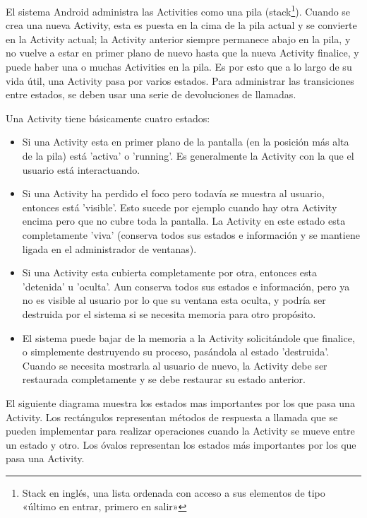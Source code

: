 El sistema Android administra las Activities como una pila (stack\footnote{Stack en inglés, una lista ordenada con acceso a sus elementos de tipo «último en entrar, primero en salir»}). Cuando se crea una nueva Activity, esta es puesta en la cima de la pila actual y se convierte en la Activity actual; la Activity anterior siempre permanece abajo en la pila, y no vuelve a estar en primer plano de nuevo hasta que la nueva Activity finalice, y puede haber una o muchas Activities en la pila.
Es por esto que a lo largo de su vida útil, una Activity pasa por varios estados. Para administrar las transiciones entre estados, se deben usar una serie de devoluciones de llamadas.

Una Activity tiene básicamente cuatro estados:

\begin{itemize}
	\item Si una Activity esta en primer plano de la pantalla (en la posición más alta de la pila) está 'activa' o 'running'. Es generalmente la Activity con la que el usuario está interactuando.
	\item Si una Activity ha perdido el foco pero todavía se muestra al usuario, entonces está 'visible'. Esto sucede por ejemplo cuando hay otra Activity encima pero que no cubre toda la pantalla. La Activity en este estado esta completamente 'viva' (conserva todos sus estados e información y se mantiene ligada en el administrador de ventanas).
	\item Si una Activity esta cubierta completamente por otra, entonces esta 'detenida' u 'oculta'. Aun conserva todos sus estados e información, pero ya no es visible al usuario por lo que su ventana esta oculta, y podría ser destruida por el sistema si se necesita memoria para otro propósito.
	\item El sistema puede bajar de la memoria a la Activity solicitándole que finalice, o simplemente destruyendo su proceso, pasándola al estado 'destruida'. Cuando se necesita mostrarla al usuario de nuevo, la Activity debe ser restaurada completamente y se debe restaurar su estado anterior.
\end{itemize}

El siguiente diagrama muestra los estados mas importantes por los que pasa una Activity. Los rectángulos representan métodos de respuesta a llamada que se pueden implementar para realizar operaciones cuando la Activity se mueve entre un estado y otro. Los óvalos representan los estados más importantes por los que pasa una Activity.
\cite{androidDocs}

